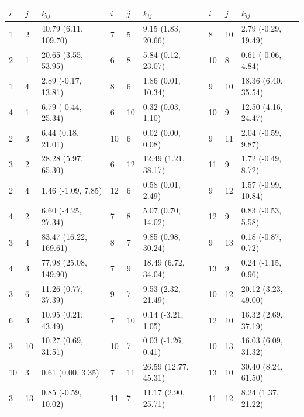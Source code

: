 \begin{table}[]
    \centering
    \label{tab:sens_2_rate_matrix}
    \begin{tabular}{lllllllll}
    \toprule
    $i$ & $j$ &               $k_{ij}$ & $i$ & $j$ &              $k_{ij}$ & $i$ & $j$ &             $k_{ij}$ \\
    \midrule
      1 &   2 &   40.79 (6.11, 109.70) &   7 &   5 &    9.15 (1.83, 20.66) &   8 &  10 &  2.79 (-0.29, 19.49) \\
      2 &   1 &    20.65 (3.55, 53.95) &   6 &   8 &    5.84 (0.12, 23.07) &  10 &   8 &   0.61 (-0.06, 4.84) \\
      1 &   4 &    2.89 (-0.17, 13.81) &   8 &   6 &    1.86 (0.01, 10.34) &   9 &  10 &  18.36 (6.40, 35.54) \\
      4 &   1 &    6.79 (-0.44, 25.34) &   6 &  10 &     0.32 (0.03, 1.10) &  10 &   9 &  12.50 (4.16, 24.47) \\
      2 &   3 &     6.44 (0.18, 21.01) &  10 &   6 &     0.02 (0.00, 0.08) &   9 &  11 &   2.04 (-0.59, 9.87) \\
      3 &   2 &    28.28 (5.97, 65.30) &   6 &  12 &   12.49 (1.21, 38.17) &  11 &   9 &   1.72 (-0.49, 8.72) \\
      2 &   4 &     1.46 (-1.09, 7.85) &  12 &   6 &     0.58 (0.01, 2.49) &   9 &  12 &  1.57 (-0.99, 10.84) \\
      4 &   2 &    6.60 (-4.25, 27.34) &   7 &   8 &    5.07 (0.70, 14.02) &  12 &   9 &   0.83 (-0.53, 5.58) \\
      3 &   4 &  83.47 (16.22, 169.61) &   8 &   7 &    9.85 (0.98, 30.24) &   9 &  13 &   0.18 (-0.87, 0.72) \\
      4 &   3 &  77.98 (25.08, 149.90) &   7 &   9 &   18.49 (6.72, 34.04) &  13 &   9 &   0.24 (-1.15, 0.96) \\
      3 &   6 &    11.26 (0.77, 37.39) &   9 &   7 &    9.53 (2.32, 21.49) &  10 &  12 &  20.12 (3.23, 49.00) \\
      6 &   3 &    10.95 (0.21, 43.49) &   7 &  10 &    0.14 (-3.21, 1.05) &  12 &  10 &  16.32 (2.69, 37.19) \\
      3 &  10 &    10.27 (0.69, 31.51) &  10 &   7 &    0.03 (-1.26, 0.41) &  10 &  13 &  16.03 (6.09, 31.32) \\
     10 &   3 &      0.61 (0.00, 3.35) &   7 &  11 &  26.59 (12.77, 45.31) &  13 &  10 &  30.40 (8.24, 61.50) \\
      3 &  13 &    0.85 (-0.59, 10.02) &  11 &   7 &   11.17 (2.90, 25.71) &  11 &  12 &   8.24 (1.37, 21.22) \\

\end{tabular}
\end{table}
